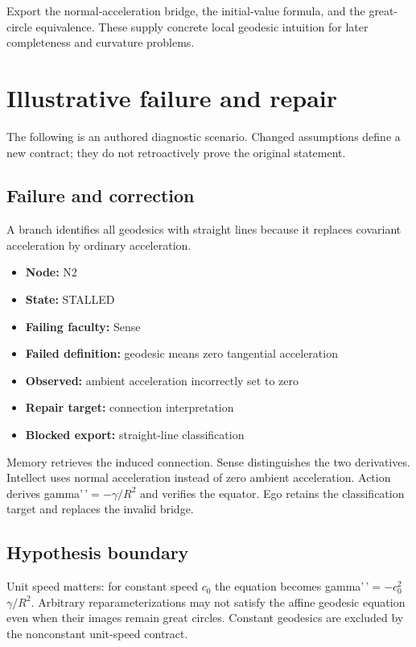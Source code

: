 \documentclass[preprint,12pt,aps,pra,showkeys,amsmath,amssymb,superscriptaddress,floatfix]{revtex4-2}
\theoremstyle{definition}
\theoremstyle{remark}
\begin{document}
Export the normal-acceleration bridge, the initial-value formula, and
the great-circle equivalence. These supply concrete local geodesic
intuition for later completeness and curvature problems.

\section{Illustrative failure and repair}

The following is an authored diagnostic scenario. Changed assumptions
define a new contract; they do not retroactively prove the original
statement.

\subsection{Failure and correction}
A branch identifies all geodesics with straight lines because it
replaces covariant acceleration by ordinary acceleration.

\begin{itemize}
\item
  \textbf{Node:} N2
\item
  \textbf{State:} STALLED
\item
  \textbf{Failing faculty:} Sense
\item
  \textbf{Failed definition:} geodesic means zero tangential
  acceleration
\item
  \textbf{Observed:} ambient acceleration incorrectly set to zero
\item
  \textbf{Repair target:} connection interpretation
\item
  \textbf{Blocked export:} straight-line classification
\end{itemize}

Memory retrieves the induced connection. Sense distinguishes the two
derivatives. Intellect uses normal acceleration instead of zero ambient
acceleration. Action derives gamma'\,'\(=-\gamma /R^{2}\) and verifies
the equator. Ego retains the classification target and replaces the
invalid bridge.

\subsection{Hypothesis boundary}
Unit speed matters: for constant speed \(c_{0}\) the equation becomes
gamma'\,'\(=-c_{0}^{2}\) \(\gamma /R^{2}\). Arbitrary
reparameterizations may not satisfy the affine geodesic equation even
when their images remain great circles. Constant geodesics are excluded
by the nonconstant unit-speed contract.
\end{document}

